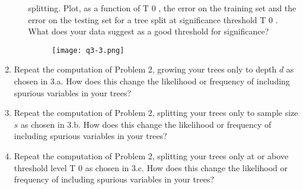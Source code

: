 \documentclass[letter, 12pt]{article}
\begin{document}
\begin{enumerate}
\begin{enumerate}
{        		splitting. Plot, as a function of T 0 , the error on the training set and the error on the testing set for a tree
        		split at significance threshold T 0 . What does your data suggest as a good threshold for significance?}
        	\begin{figure}[H]
        		\centering
        		\texttt{[image: q3-3.png]}
        	\end{figure}
        \end{enumerate}
        \item{Repeat the computation of Problem 2, growing your trees only to depth $ d $ as chosen in 3.a. How does this
        	change the likelihood or frequency of including spurious variables in your trees?}
        \item{Repeat the computation of Problem 2, splitting your trees only to sample size $ s $ as chosen in 3.b. How does
        	this change the likelihood or frequency of including spurious variables in your trees?}
        \item{Repeat the computation of Problem 2, splitting your trees only at or above threshold level T 0 as chosen in 3.c.
        	How does this change the likelihood or frequency of including spurious variables in your trees?}
    \end{enumerate}
\end{document}
